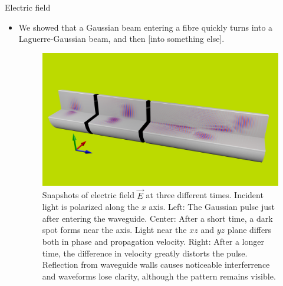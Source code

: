 \documentclass{beamer}
\newlength{\wideitemsep}
\let\olditem\item
\renewcommand{\item}{\setlength{\itemsep}{\wideitemsep}\olditem}
\newcommand{\blockpadding}{
  \rule[-0.6ex]{0pt}{2.5ex}
}
\begin{document}
\begin{columns}[t]
 \begin{column}{0.596\textwidth}
  \begin{block}{\blockpadding Electric field}
  \begin{itemize}
   \item We showed that a Gaussian beam entering a fibre quickly turns into a Laguerre-Gaussian beam, and then [into something else]. 
\begin{figure}[h]
\centering
 \includegraphics[width=.825\textwidth,clip,trim=0mm 50mm 0mm 80mm]{./render}
 \caption{Snapshots of electric field $\vec E$ at three different times. Incident light is polarized along the $x$ axis. {\color{dark} Left:} The Gaussian pulse just after entering the waveguide. {\color{dark} Center:} After a short time, a dark spot forms near the axis. Light near the $xz$ and $yz$ plane differs both in phase and propagation velocity. {\color{dark} Right:} After a longer time, the difference in velocity greatly distorts the pulse. Reflection from waveguide walls causes noticeable interferrence and waveforms lose clarity, although the pattern remains visible. }
\end{figure}
\end{itemize}


\end{block}
\end{column}
\end{columns}
\end{document}
